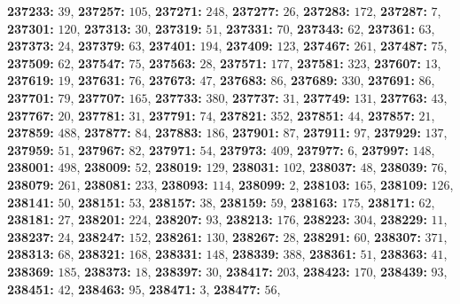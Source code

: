 \textsf{\bfseries 237233:} $39$, \textsf{\bfseries 237257:} $105$, \textsf{\bfseries 237271:} $248$, \textsf{\bfseries 237277:} $26$, \textsf{\bfseries 237283:} $172$, \textsf{\bfseries 237287:} $7$, \textsf{\bfseries 237301:} $120$, \textsf{\bfseries 237313:} $30$, \textsf{\bfseries 237319:} $51$, \textsf{\bfseries 237331:} $70$, \textsf{\bfseries 237343:} $62$, \textsf{\bfseries 237361:} $63$, \textsf{\bfseries 237373:} $24$, \textsf{\bfseries 237379:} $63$, \textsf{\bfseries 237401:} $194$, \textsf{\bfseries 237409:} $123$, \textsf{\bfseries 237467:} $261$, \textsf{\bfseries 237487:} $75$, \textsf{\bfseries 237509:} $62$, \textsf{\bfseries 237547:} $75$, \textsf{\bfseries 237563:} $28$, \textsf{\bfseries 237571:} $177$, \textsf{\bfseries 237581:} $323$, \textsf{\bfseries 237607:} $13$, \textsf{\bfseries 237619:} $19$, \textsf{\bfseries 237631:} $76$, \textsf{\bfseries 237673:} $47$, \textsf{\bfseries 237683:} $86$, \textsf{\bfseries 237689:} $330$, \textsf{\bfseries 237691:} $86$, \textsf{\bfseries 237701:} $79$, \textsf{\bfseries 237707:} $165$, \textsf{\bfseries 237733:} $380$, \textsf{\bfseries 237737:} $31$, \textsf{\bfseries 237749:} $131$, \textsf{\bfseries 237763:} $43$, \textsf{\bfseries 237767:} $20$, \textsf{\bfseries 237781:} $31$, \textsf{\bfseries 237791:} $74$, \textsf{\bfseries 237821:} $352$, \textsf{\bfseries 237851:} $44$, \textsf{\bfseries 237857:} $21$, \textsf{\bfseries 237859:} $488$, \textsf{\bfseries 237877:} $84$, \textsf{\bfseries 237883:} $186$, \textsf{\bfseries 237901:} $87$, \textsf{\bfseries 237911:} $97$, \textsf{\bfseries 237929:} $137$, \textsf{\bfseries 237959:} $51$, \textsf{\bfseries 237967:} $82$, \textsf{\bfseries 237971:} $54$, \textsf{\bfseries 237973:} $409$, \textsf{\bfseries 237977:} $6$, \textsf{\bfseries 237997:} $148$, \textsf{\bfseries 238001:} $498$, \textsf{\bfseries 238009:} $52$, \textsf{\bfseries 238019:} $129$, \textsf{\bfseries 238031:} $102$, \textsf{\bfseries 238037:} $48$, \textsf{\bfseries 238039:} $76$, \textsf{\bfseries 238079:} $261$, \textsf{\bfseries 238081:} $233$, \textsf{\bfseries 238093:} $114$, \textsf{\bfseries 238099:} $2$, \textsf{\bfseries 238103:} $165$, \textsf{\bfseries 238109:} $126$, \textsf{\bfseries 238141:} $50$, \textsf{\bfseries 238151:} $53$, \textsf{\bfseries 238157:} $38$, \textsf{\bfseries 238159:} $59$, \textsf{\bfseries 238163:} $175$, \textsf{\bfseries 238171:} $62$, \textsf{\bfseries 238181:} $27$, \textsf{\bfseries 238201:} $224$, \textsf{\bfseries 238207:} $93$, \textsf{\bfseries 238213:} $176$, \textsf{\bfseries 238223:} $304$, \textsf{\bfseries 238229:} $11$, \textsf{\bfseries 238237:} $24$, \textsf{\bfseries 238247:} $152$, \textsf{\bfseries 238261:} $130$, \textsf{\bfseries 238267:} $28$, \textsf{\bfseries 238291:} $60$, \textsf{\bfseries 238307:} $371$, \textsf{\bfseries 238313:} $68$, \textsf{\bfseries 238321:} $168$, \textsf{\bfseries 238331:} $148$, \textsf{\bfseries 238339:} $388$, \textsf{\bfseries 238361:} $51$, \textsf{\bfseries 238363:} $41$, \textsf{\bfseries 238369:} $185$, \textsf{\bfseries 238373:} $18$, \textsf{\bfseries 238397:} $30$, \textsf{\bfseries 238417:} $203$, \textsf{\bfseries 238423:} $170$, \textsf{\bfseries 238439:} $93$, \textsf{\bfseries 238451:} $42$, \textsf{\bfseries 238463:} $95$, \textsf{\bfseries 238471:} $3$, \textsf{\bfseries 238477:} $56$, 
